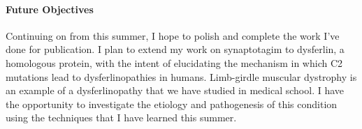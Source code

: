 \documentclass[12pt]{article}
\begin{document}
\paragraph{Future Objectives}
Continuing on from this summer, I hope to polish and complete the work I've done for publication. 
I plan to extend my work on synaptotagim to dysferlin, a homologous protein, with the intent of elucidating the mechanism
in which C2 mutations lead to dysferlinopathies in humans. Limb-girdle muscular dystrophy is an example
of a dysferlinopathy that we have studied in medical school. I have the opportunity to investigate the
etiology and pathogenesis of this condition using the techniques that I have learned this summer.
\end{document}
